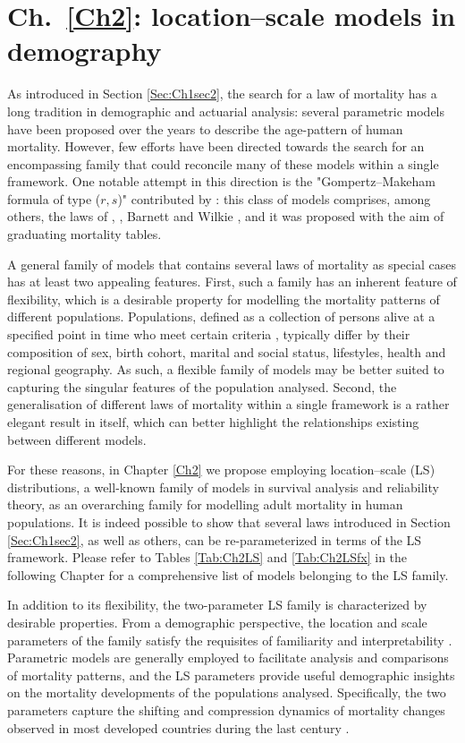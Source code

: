 \documentclass[Thesis]{subfiles}
\begin{document}
\section{Ch.~\ref{Ch2}: location--scale models in demography}\label{Sec:Ch1sec5}  
As introduced in Section \ref{Sec:Ch1sec2}, the search for a law of mortality  has a long tradition in demographic and actuarial analysis: several parametric models have been proposed over the years to describe the age-pattern of human mortality.  However, few efforts have been directed towards the search for an encompassing family that could reconcile many of these models within a single framework. One notable attempt in this direction is the "Gompertz--Makeham formula of type ($r,s$)" contributed by \cite{forfar1988graduation}: this class of models comprises, among others, the laws of \cite{gompertz1825nature}, \cite{makeham1860law}, Barnett \citep{cmi1974considerations} and Wilkie \citep{cmi1976graduation}, and it was proposed with the aim of graduating mortality tables.  

A general family of models that contains several laws of mortality as special cases has at least two appealing features. First, such a family has an inherent feature of flexibility, which is a desirable property for modelling the mortality patterns of different populations. Populations, defined as a collection of persons alive at a specified point in time who meet certain criteria \citep{preston2001demogr}, typically differ by their composition of sex, birth cohort, marital and social status, lifestyles, health and regional geography. As such, a flexible family of models may be better suited to capturing the singular features of the population analysed. Second, the generalisation of different laws of mortality within a single framework is a rather elegant result in itself, which can better highlight the relationships existing between different models. 

For these reasons, in Chapter \ref{Ch2} we propose employing location--scale (LS) distributions, a well-known family of models in survival analysis and reliability theory, as an overarching family for modelling adult mortality in human populations. It is indeed possible to show that several laws introduced in Section \ref{Sec:Ch1sec2}, as well as others, can be re-parameterized in terms of the LS framework. Please refer to Tables \ref{Tab:Ch2LS} and \ref{Tab:Ch2LSfx} in the following Chapter for a comprehensive list of models belonging to the LS family.

In addition to its flexibility, the two-parameter LS family is characterized by desirable properties. From a demographic perspective, the location and scale parameters of the family satisfy the requisites of familiarity and interpretability \citep{bell1997comparing}. Parametric models are generally employed to facilitate analysis and comparisons of mortality patterns, and the LS parameters provide useful demographic insights on the mortality developments of the populations analysed. Specifically, the two parameters capture the shifting and compression dynamics of mortality changes observed in most developed countries during the last century \cite[see, e.g.,][]{fries1980aging,kannisto2001mode,bongaarts2005long,janssen2019timing}.
\end{document}
